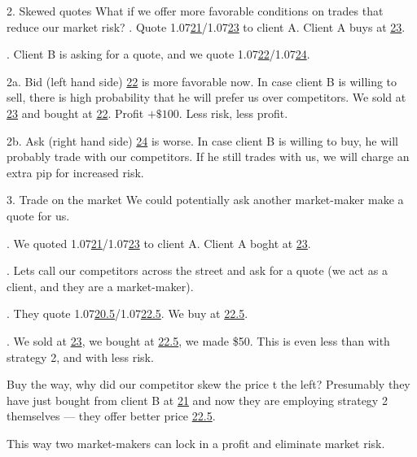\documentclass{beamer}
\begin{document}
\begin{frame}{2. Skewed quotes}
\justify
What if we offer more favorable conditions on trades that reduce our market risk?
. Quote 1.07\underline{21}/1.07\underline{23} to client A. Client A buys at \underline{23}.

. Client B is asking for a quote, and we quote 1.07\underline{22}/1.07\underline{24}.

\justify
2a. Bid (left hand side) \underline{22} is more favorable now. In case client B is willing to sell, there is high probability that he will prefer us over competitors.
We sold at \underline{23} and bought at \underline{22}. Profit $+\$100$. Less risk, less profit.

\justify
2b. Ask (right hand side) \underline{24} is worse. In case client B is willing to buy, he will probably trade with our competitors. If he still trades with us, we will charge an extra pip for increased risk.
\end{frame}



\begin{frame}{3. Trade on the market }
\justify
We could potentially ask another market-maker make a quote for us.

. We quoted 1.07\underline{21}/1.07\underline{23} to client A. Client A boght at \underline{23}.

. Lets call our competitors across the street and ask for a quote (we act as a client, and they are a market-maker).

. They quote 1.07\underline{20.5}/1.07\underline{22.5}. We buy at \underline{22.5}.

. We sold at \underline{23}, we bought at \underline{22.5}, we made \$50. This is even less than with strategy 2, and with less risk.

\justify
Buy the way, why did our competitor skew the price t the left? Presumably they have just bought from client B at \underline{21} and now they are employing strategy 2 themselves --- they offer better price \underline{22.5}.

\justify
This way two market-makers can lock in a profit and eliminate market risk.
\end{frame}
\end{document}
